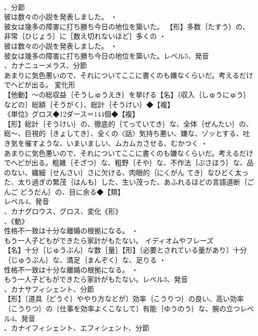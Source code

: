 \documentclass[8pt]{extreport}
\begin{document}
\begin{CJK}{UTF8}{min}
\\	、分節
\\	彼は数々の小説を発表しました。 ・
\\	彼女は幾多の障害に打ち勝ち今日の地位を築いた。		【形】多数｛たすう｝の、非常｛ひじょう｝に［数え切れないほど］多くの ・
\\	彼は数々の小説を発表しました。 ・
\\	彼女は幾多の障害に打ち勝ち今日の地位を築いた。レベル5、発音
\\	、カナニューメラス、分節
\\	あまりに気色悪いので、それについてここに書くのも嫌なくらいだ。考えるだけでへどが出る。	変化形 
\\	【他動】～の総収益｛そうしゅうえき｝を挙げる【名】〔収入｛しゅうにゅう｝などの〕総額｛そうがく｝、総計｛そうけい｝◆【複】
\\	《単位》グロス◆12ダース＝144個◆【複】
\\	【形】総計｛そうけい｝の、徹底的｛てっていてき｝な、全体｛ぜんたい｝の、総～、巨視的｛きょしてき｝、全くの〈話〉気持ち悪い、嫌な、ゾッとする、吐き気を催すような、いまいましい、ムカムカさせる、むかつく ・
\\	あまりに気色悪いので、それについてここに書くのも嫌なくらいだ。考えるだけでへどが出る。粗雑｛そざつ｝な、粗野｛そや｝な、不作法｛ぶさほう｝な、品のない、繊細｛せんさい｝さに欠ける、肉眼的｛にくがん てき｝なひどく太った、太り過ぎの繁茂｛はんも｝した、生い茂った、あふれるほどの言語道断｛ごんご どうだん｝の、目に余る◆【類】
\\	レベル4、発音
\\	、カナグロウス、グロス、変化《形》
\\	、《動》
\\	性格不一致は十分な離婚の根拠になる。 ・
\\	もう一人子どもができたら家計がもたない。	イディオムやフレーズ 
\\	【名】十分｛じゅうぶん｝な数［量］【形】〔必要とされている量があり〕十分｛じゅうぶん｝な、満足｛まんぞく｝な、足りる ・
\\	性格不一致は十分な離婚の根拠になる。 ・
\\	もう一人子どもができたら家計がもたない。レベル3、発音
\\	、カナサフィシェント、分節
\\	【形】〔道具｛どうぐ｝ややり方などが〕効率｛こうりつ｝の良い、高い効率｛こうりつ｝の〔仕事を効率よくこなして〕有能｛ゆうのう｝な、腕の立つレベル4、発音
\\	、カナイフィシェント、エフィシェント、分節

\end{CJK}
\end{document}
